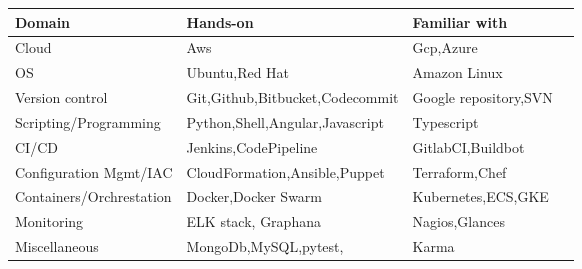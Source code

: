 \documentclass[9pt]{developercv} %
\begin{document}
\begin{tabular}{ |p{5cm}|p{6cm}|p{5cm}|p{3cm}|  }
 
 \hline
 \hspace{0.1cm}\textbf{Domain}& \hspace{0.1cm}\textbf{Hands-on}&\hspace{0.1cm}\textbf{Familiar with}\\
 \hline
\hspace{0.1cm} Cloud   & \hspace{0.1cm}Aws    &\hspace{0.1cm}Gcp,Azure\\
 \hline
 \hspace{0.1cm} OS&  \hspace{0.1cm}Ubuntu,Red Hat & \hspace{0.1cm}Amazon Linux  \\
 \hline
\hspace{0.1cm} Version control&  \hspace{0.1cm}Git,Github,Bitbucket,Codecommit & \hspace{0.1cm}Google repository,SVN  \\
 \hline
\hspace{0.1cm} Scripting/Programming &\hspace{0.1cm}Python,Shell,Angular,Javascript & \hspace{0.1cm}Typescript\\
 \hline
\hspace{0.1cm} CI/CD    &\hspace{0.1cm}Jenkins,CodePipeline & \hspace{0.1cm}GitlabCI,Buildbot\\
 \hline
\hspace{0.1cm} Configuration Mgmt/IAC &   \hspace{0.1cm}CloudFormation,Ansible,Puppet  & \hspace{0.1cm}Terraform,Chef\\
\hline
\hspace{0.1cm} Containers/Orchrestation& \hspace{0.1cm}Docker,Docker Swarm  & \hspace{0.1cm}Kubernetes,ECS,GKE   \\
 \hline
 
 \hspace{0.1cm} Monitoring& \hspace{0.1cm}ELK stack, Graphana  & \hspace{0.1cm}Nagios,Glances\\
 \hline
 \hspace{0.1cm} Miscellaneous& \hspace{0.1cm}MongoDb,MySQL,pytest,  & \hspace{0.1cm}Karma\\
 \hline
\end{tabular}
\end{document}
